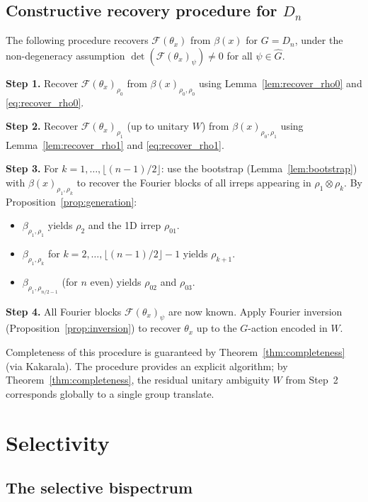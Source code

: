 \documentclass{article}
\theoremstyle{definition}
\theoremstyle{remark}
\newcommand{\FF}{\mathcal{F}}
\newcommand{\Ghat}{\widehat{G}}
\begin{document}
\subsection{Constructive recovery procedure for $D_n$}

The following procedure recovers $\FF(\theta_x)$ from $\beta(x)$ for $G = D_n$, under the non-degeneracy assumption $\det(\FF(\theta_x)_\psi) \neq 0$ for all $\psi \in \Ghat$.

\textbf{Step 1.} Recover $\FF(\theta_x)_{\rho_0}$ from $\beta(x)_{\rho_0,\rho_0}$ using Lemma~\ref{lem:recover_rho0} and \eqref{eq:recover_rho0}.

\textbf{Step 2.} Recover $\FF(\theta_x)_{\rho_1}$ (up to unitary $W$) from $\beta(x)_{\rho_0, \rho_1}$ using Lemma~\ref{lem:recover_rho1} and \eqref{eq:recover_rho1}.

\textbf{Step 3.} For $k = 1, \ldots, \lfloor(n-1)/2\rfloor$: use the bootstrap (Lemma~\ref{lem:bootstrap}) with $\beta(x)_{\rho_1, \rho_k}$ to recover the Fourier blocks of all irreps appearing in $\rho_1 \otimes \rho_k$. By Proposition~\ref{prop:generation}:
\begin{itemize}
    \item $\beta_{\rho_1, \rho_1}$ yields $\rho_2$ and the 1D irrep $\rho_{01}$.
    \item $\beta_{\rho_1, \rho_k}$ for $k = 2, \ldots, \lfloor(n-1)/2\rfloor - 1$ yields $\rho_{k+1}$.
    \item $\beta_{\rho_1, \rho_{n/2-1}}$ (for $n$ even) yields $\rho_{02}$ and $\rho_{03}$.
\end{itemize}

\textbf{Step 4.} All Fourier blocks $\FF(\theta_x)_\psi$ are now known. Apply Fourier inversion (Proposition~\ref{prop:inversion}) to recover $\theta_x$ up to the $G$-action encoded in $W$.

Completeness of this procedure is guaranteed by Theorem~\ref{thm:completeness} (via Kakarala). The procedure provides an explicit algorithm; by Theorem~\ref{thm:completeness}, the residual unitary ambiguity $W$ from Step~2 corresponds globally to a single group translate.

\section{Selectivity}\label{sec:selectivity}

\subsection{The selective bispectrum}
\end{document}
